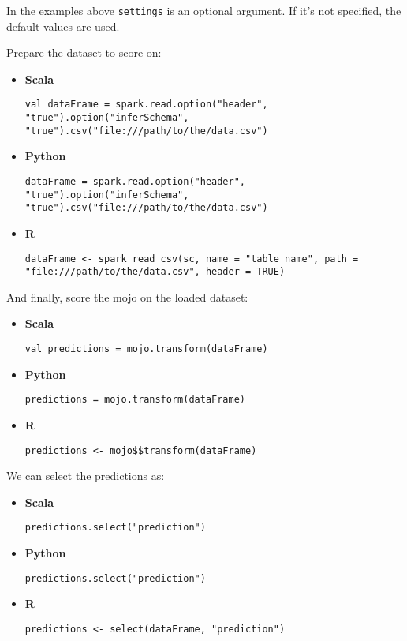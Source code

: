 In the examples above \texttt{settings} is an optional argument. If it's not specified, the default values are used.

Prepare the dataset to score on:

\begin{itemize}
    \item \textbf{Scala} \begin{lstlisting}[style=Scala]
val dataFrame = spark.read.option("header", "true").option("inferSchema", "true").csv("file:///path/to/the/data.csv")
    \end{lstlisting}
    \item \textbf{Python} \begin{lstlisting}[style=Python]
dataFrame = spark.read.option("header", "true").option("inferSchema", "true").csv("file:///path/to/the/data.csv")
    \end{lstlisting}
    \item \textbf{R} \begin{lstlisting}[style=R]
dataFrame <- spark_read_csv(sc, name = "table_name", path = "file:///path/to/the/data.csv", header = TRUE)
    \end{lstlisting}
\end{itemize}

And finally, score the mojo on the loaded dataset:

\begin{itemize}
    \item \textbf{Scala} \begin{lstlisting}[style=Scala]
val predictions = mojo.transform(dataFrame)
    \end{lstlisting}
    \item \textbf{Python} \begin{lstlisting}[style=Python]
predictions = mojo.transform(dataFrame)
    \end{lstlisting}
    \item \textbf{R} \begin{lstlisting}[style=R]
predictions <- mojo$$transform(dataFrame)
    \end{lstlisting}
\end{itemize}

We can select the predictions as:

\begin{itemize}
    \item \textbf{Scala} \begin{lstlisting}[style=Scala]
predictions.select("prediction")
    \end{lstlisting}
    \item \textbf{Python} \begin{lstlisting}[style=Python]
predictions.select("prediction")
    \end{lstlisting}
    \item \textbf{R} \begin{lstlisting}[style=R]
predictions <- select(dataFrame, "prediction")
    \end{lstlisting}
\end{itemize}



